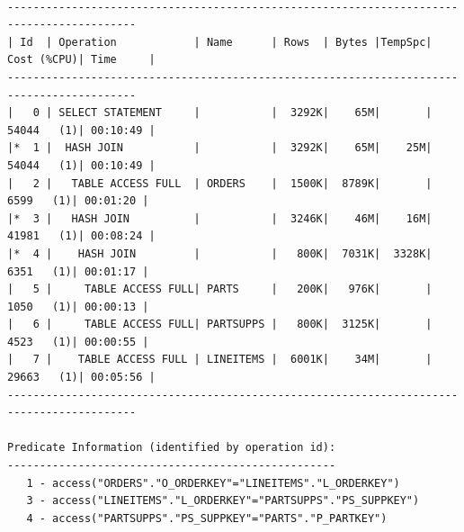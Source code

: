 \documentclass[10pt]{article}
\begin{document}
\begin{lstlisting}[style=queryexecutionplan]

------------------------------------------------------------------------------------------
| Id  | Operation            | Name      | Rows  | Bytes |TempSpc| Cost (%CPU)| Time     |
------------------------------------------------------------------------------------------
|   0 | SELECT STATEMENT     |           |  3292K|    65M|       | 54044   (1)| 00:10:49 |
|*  1 |  HASH JOIN           |           |  3292K|    65M|    25M| 54044   (1)| 00:10:49 |
|   2 |   TABLE ACCESS FULL  | ORDERS    |  1500K|  8789K|       |  6599   (1)| 00:01:20 |
|*  3 |   HASH JOIN          |           |  3246K|    46M|    16M| 41981   (1)| 00:08:24 |
|*  4 |    HASH JOIN         |           |   800K|  7031K|  3328K|  6351   (1)| 00:01:17 |
|   5 |     TABLE ACCESS FULL| PARTS     |   200K|   976K|       |  1050   (1)| 00:00:13 |
|   6 |     TABLE ACCESS FULL| PARTSUPPS |   800K|  3125K|       |  4523   (1)| 00:00:55 |
|   7 |    TABLE ACCESS FULL | LINEITEMS |  6001K|    34M|       | 29663   (1)| 00:05:56 |
------------------------------------------------------------------------------------------
 
Predicate Information (identified by operation id):
---------------------------------------------------
   1 - access("ORDERS"."O_ORDERKEY"="LINEITEMS"."L_ORDERKEY")
   3 - access("LINEITEMS"."L_ORDERKEY"="PARTSUPPS"."PS_SUPPKEY")
   4 - access("PARTSUPPS"."PS_SUPPKEY"="PARTS"."P_PARTKEY")
\end{lstlisting}
\end{document}
